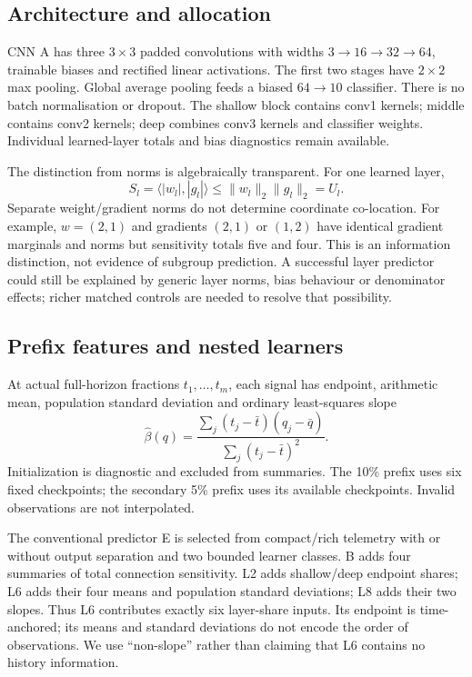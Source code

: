 \documentclass[nolineno]{ieeeaccess}
\begin{document}
\subsection{Architecture and allocation}
CNN A has three $3\times3$ padded convolutions with widths $3\!\rightarrow\!16\!\rightarrow\!32\!\rightarrow\!64$, trainable biases and rectified linear activations. The first two stages have $2\times2$ max pooling. Global average pooling feeds a biased $64\!\rightarrow\!10$ classifier. There is no batch normalisation or dropout. The shallow block contains conv1 kernels; middle contains conv2 kernels; deep combines conv3 kernels and classifier weights. Individual learned-layer totals and bias diagnostics remain available.

The distinction from norms is algebraically transparent. For one learned layer,
\begin{equation}
S_l=\langle|w_l|,|g_l|\rangle
\leq\|w_l\|_2\|g_l\|_2=U_l.
\label{eq:norm}
\end{equation}
Separate weight/gradient norms do not determine coordinate co-location. For example, $w=(2,1)$ and gradients $(2,1)$ or $(1,2)$ have identical gradient marginals and norms but sensitivity totals five and four. This is an information distinction, not evidence of subgroup prediction. A successful layer predictor could still be explained by generic layer norms, bias behaviour or denominator effects; richer matched controls are needed to resolve that possibility.

\subsection{Prefix features and nested learners}
At actual full-horizon fractions $t_1,\ldots,t_m$, each signal has endpoint, arithmetic mean, population standard deviation and ordinary least-squares slope
\begin{equation}
\widehat\beta(q)=\frac{\sum_j(t_j-\bar t)(q_j-\bar q)}{\sum_j(t_j-\bar t)^2}.
\label{eq:slope}
\end{equation}
Initialization is diagnostic and excluded from summaries. The 10\% prefix uses six fixed checkpoints; the secondary 5\% prefix uses its available checkpoints. Invalid observations are not interpolated.

The conventional predictor E is selected from compact/rich telemetry with or without output separation and two bounded learner classes. B adds four summaries of total connection sensitivity. L2 adds shallow/deep endpoint shares; L6 adds their four means and population standard deviations; L8 adds their two slopes. Thus L6 contributes exactly six layer-share inputs. Its endpoint is time-anchored; its means and standard deviations do not encode the order of observations. We use ``non-slope'' rather than claiming that L6 contains no history information.
\end{document}
